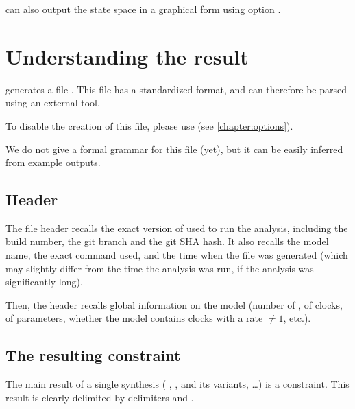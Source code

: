 \imitator{} can also output the state space in a graphical form using option .


\chapter{Understanding the \imitator{} result}\label{chapter:result}

\imitator{} generates a file .
This file has a standardized format, and can therefore be parsed using an external tool.

To disable the creation of this file, please use 
(see \cref{chapter:options}).

We do not give a formal grammar for this file (yet), but it can be easily inferred from example outputs.


\section{Header}

The file header recalls the exact version of \imitator{} used to run the analysis, including the build number, the git branch and the git SHA hash.
It also recalls the model name, the exact command used, and the time when the file was generated (which may slightly differ from the time the analysis was run, if the analysis was significantly long).

Then, the header recalls global information on the model (number of \IPTA{}, of clocks, of parameters, whether the model contains clocks with a rate $\neq 1$, etc.).


\section{The resulting constraint}

The main result of a single synthesis (\ie{} \EFsynth{}, \PDFC{}, \IM{} and its variants, \PRP{}…) is a constraint.
This result is clearly delimited by delimiters  and .


